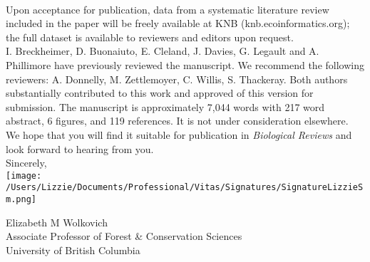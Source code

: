 \documentclass[11pt,a4paper]{article}
\begin{document}
\vspace{1.5ex}\\
Upon acceptance for publication, data from a systematic literature review included in the paper will be freely available at KNB (knb.ecoinformatics.org); the full dataset is available to reviewers and editors upon request. %
\vspace{1.5ex}\\
I. Breckheimer, D. Buonaiuto, E. Cleland, J. Davies, G. Legault and A. Phillimore have previously reviewed the manuscript. We recommend the following reviewers: A. Donnelly, M. Zettlemoyer, C. Willis, S. Thackeray.  Both authors substantially contributed to this work and approved of this version for submission. The manuscript is approximately 7,044 words with 217 word abstract, 6 figures, and 119 references. It is not under consideration elsewhere. We hope that you will find it suitable for publication in \emph{Biological Reviews} and look forward to hearing from you.
\vspace{1.5ex}\\
Sincerely,\\

\texttt{[image: /Users/Lizzie/Documents/Professional/Vitas/Signatures/SignatureLizzieSm.png]} 

\noindent Elizabeth M Wolkovich\\
Associate Professor of Forest \& Conservation Sciences\\ 
University of British Columbia


\end{document}
